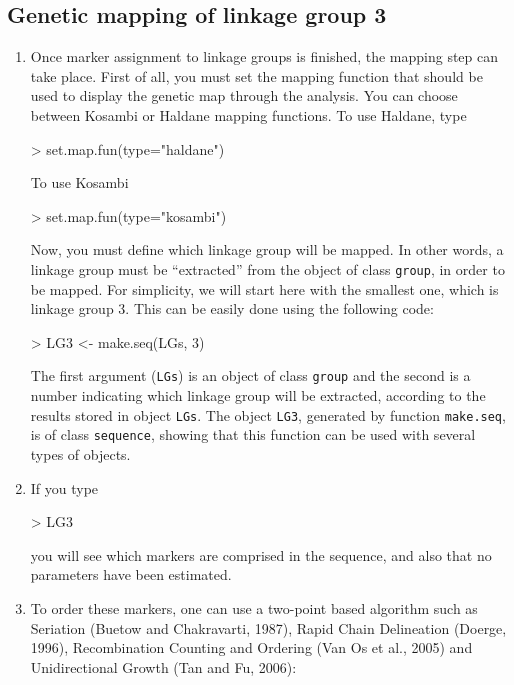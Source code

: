 \documentclass[letterpaper,12pt,oneside]{article}
\begin{document}
\subsection{Genetic mapping of linkage group 3}
\label{group3outcrossing}
\begin{enumerate}
\item Once marker assignment to linkage groups is finished, the mapping step can take place. First of all, you must set the mapping function that should be used to display the genetic map through the analysis. You can choose between Kosambi or Haldane mapping functions. To use Haldane, type
\begin{Schunk}
\begin{Sinput}
> set.map.fun(type="haldane")
\end{Sinput}
\end{Schunk}

To use Kosambi
\begin{Schunk}
\begin{Sinput}
> set.map.fun(type="kosambi")
\end{Sinput}
\end{Schunk}

Now, you must define which linkage group will be mapped. In other words, a linkage group must be ``extracted'' from the object of class {\tt group}, in order to be mapped. For simplicity, we will start here with the smallest one, which is linkage group 3. This can be easily done using the following code:
\begin{Schunk}
\begin{Sinput}
> LG3 <- make.seq(LGs, 3)
\end{Sinput}
\end{Schunk}
The first argument ({\tt LGs}) is an object of class {\tt group} and the second is a number indicating which linkage group will be extracted, according to the results stored in object {\tt LGs}. The object {\tt LG3}, generated by function {\tt make.seq}, is of class {\tt sequence}, showing that this function can be used with several types of objects.

\item If you type
\begin{Schunk}
\begin{Sinput}
> LG3
\end{Sinput}
\end{Schunk}
you will see which markers are comprised in the sequence, and also that no parameters have been estimated.

\item To order these markers, one can use a two-point based algorithm such as Seriation (Buetow and Chakravarti, 1987), Rapid Chain Delineation (Doerge, 1996), Recombination Counting and Ordering (Van Os et al., 2005) and Unidirectional Growth (Tan and Fu, 2006):
  

\end{enumerate}
\end{document}
